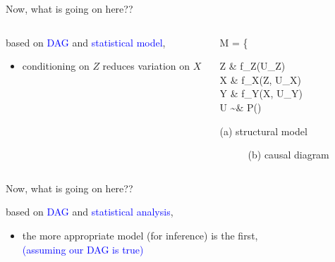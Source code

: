 \begin{frame}
	{Now, what is going on here??}
	\begin{columns}
		\begin{column}{0.5\textwidth}
			based on \textcolor{blue}{DAG} and \textcolor{blue}{statistical model},
			\begin{itemize}
				\item conditioning on $Z$ reduces variation on $X$
			\end{itemize}
		\end{column}
		\begin{column}{0.5\textwidth}  
			\begin{equ}
				M = \left\{ \begin{aligned} 
					Z \leftarrow & \; f_{Z}(U_{Z}) \\
					X \leftarrow & \; f_{X}(Z, U_{X}) \\
					Y \leftarrow & \; f_{Y}(X, U_{Y}) \\
					U \sim & \; P()
				\end{aligned} \right
				\caption*{(a) structural model}
			\end{equ}
			\begin{figure}
				\caption*{(b) causal diagram}
			\end{figure}
		\end{column}
	\end{columns}
\end{frame}
%
%
\begin{lhframe}[rhgraphic={\texttt{[image: pipe1\_reg1.png]}}]
	{Now, what is going on here??}
	
	based on \textcolor{blue}{DAG} and \textcolor{blue}{statistical analysis},
	\begin{itemize}
		\item the more appropriate model (for inference) is the first, \\
		{\small \textcolor{blue}{(assuming our DAG is true)} }
	\end{itemize}
\end{lhframe}

